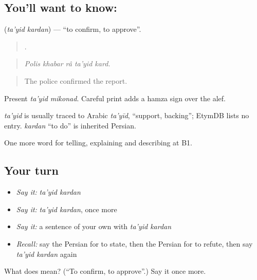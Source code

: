 \subsection*{You'll want to know:  }
\textbf{ } (\emph{ta'yid kardan}) — \textquotedblleft{}to confirm, to approve\textquotedblright{}.

\begin{quote}
    .
\end{quote}

\begin{quote}
\emph{Polis khabar râ ta'yid kard.}
\end{quote}

\begin{quote}
The police confirmed the report.
\end{quote}

Present \emph{ta'yid mikonad}. Careful print adds a hamza sign over the alef.

\begin{cousinweb}
\emph{ta'yid} is usually traced to Arabic \emph{ta'yīd}, \textquotedblleft{}support, backing\textquotedblright{}; EtymDB lists no entry. \emph{kardan} \textquotedblleft{}to do\textquotedblright{} is inherited Persian.
\end{cousinweb}

\begin{grammarlens}[title={What you've built}]
One more word for telling, explaining and describing at B1.
\end{grammarlens}

\subsection*{Your turn}
\begin{itemize}
\raggedright
  \item \emph{Say it:} \emph{ta'yid kardan}
  \item \emph{Say it:} \emph{ta'yid kardan}, once more
  \item \emph{Say it:} a sentence of your own with \emph{ta'yid kardan}
  \item \emph{Recall:} say the Persian for to state, then the Persian for to refute, then say \emph{ta'yid kardan} again
\end{itemize}

\begin{tcolorbox}[breakable,colback=teal!4,colframe=teal!35!black,title={Before you move on}]
What does   mean? (\textquotedblleft{}To confirm, to approve\textquotedblright{}.) Say it once more.
\end{tcolorbox}
